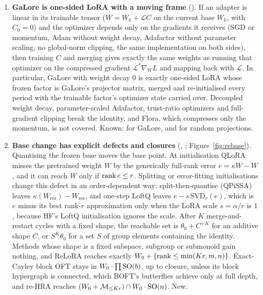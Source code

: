 \begin{enumerate}[label=\textbf{\arabic*.},leftmargin=1.9em]
\item \textbf{GaLore is one-sided LoRA with a moving frame} (). If an adapter is linear in its trainable tensor ($W=W_k+\mathcal LC$ on the current base $W_k$, with $C_0=0$) and the optimizer depends only on the gradients it receives (SGD or momentum, Adam without weight decay, Adafactor without parameter scaling, no global-norm clipping, the same implementation on both sides), then training $C$ and merging gives exactly the same weights as running that optimizer on the compressed gradient $\mathcal L^*\nabla_WL$ and mapping back with $\mathcal L$. In particular, GaLore with weight decay $0$ is exactly one-sided LoRA whose frozen factor is GaLore's projector matrix, merged and re-initialised every period with the trainable factor's optimizer state carried over. Decoupled weight decay, parameter-scaled Adafactor, trust-ratio optimizers and full-gradient clipping break the identity, and Flora, which compresses only the momentum, is not covered. Known: \citet{xtorrobahennigen2025duality} for GaLore, and \citet{hao2024flora} for random projections.

\item \textbf{Base change has explicit defects and closures} (, ; Figure~\ref{fig:rebase}). Quantising the frozen base moves the base point. At initialisation QLoRA misses the pretrained weight $W$ by the generically full-rank error $e=\kappa W-W$, and it can reach $W$ only if $\operatorname{rank} e\le r$. Splitting or error-fitting initialisations change this defect in an order-dependent way: split-then-quantise (QPiSSA) leaves $\kappa(W_{\mathrm{res}})-W_{\mathrm{res}}$, and one-step LoftQ leaves $e-s\,\mathrm{SVD}_r(e)$, which is $e$ minus its best rank-$r$ approximation only when the LoRA scale $s=\alpha/r$ is $1$, because HF's LoftQ initialisation ignores the scale. After $K$ merge-and-restart cycles with a fixed shape, the reachable set is $\theta_0+C^{+K}$ for an additive shape $C$, or $S^K\theta_0$ for a set $S$ of group elements containing the identity. Methods whose shape is a fixed subspace, subgroup or submonoid gain nothing, and ReLoRA reaches exactly $W_0+\{\operatorname{rank}\le\min(Kr,m,n)\}$. Exact-Cayley block OFT stays in $W_0\cdot\prod\mathrm{SO}(b)$, up to closure, unless its block hypergraph is connected, which BOFT's butterflies achieve only at full depth, and re-HRA reaches $(W_0+\mathcal{M}_{\le Kr})\cap W_0\cdot\mathrm{SO}(n)$. New.


\end{enumerate}
